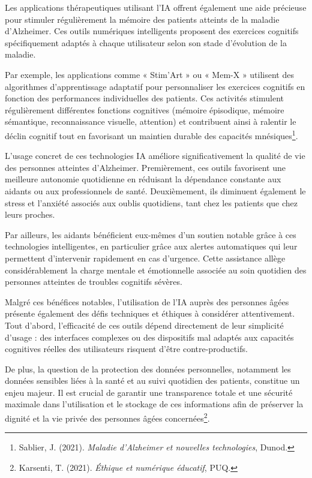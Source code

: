\documentclass[12pt,a4paper]{report}
\begin{document}
Les applications thérapeutiques utilisant l’IA offrent également une aide précieuse pour stimuler régulièrement la mémoire des patients atteints de la maladie d’Alzheimer. Ces outils numériques intelligents proposent des exercices cognitifs spécifiquement adaptés à chaque utilisateur selon son stade d’évolution de la maladie.

Par exemple, les applications comme « Stim’Art » ou « Mem-X » utilisent des algorithmes d’apprentissage adaptatif pour personnaliser les exercices cognitifs en fonction des performances individuelles des patients. Ces activités stimulent régulièrement différentes fonctions cognitives (mémoire épisodique, mémoire sémantique, reconnaissance visuelle, attention) et contribuent ainsi à ralentir le déclin cognitif tout en favorisant un maintien durable des capacités mnésiques\footnote{Sablier, J. (2021). \textit{Maladie d’Alzheimer et nouvelles technologies}, Dunod.}.

L’usage concret de ces technologies IA améliore significativement la qualité de vie des personnes atteintes d’Alzheimer. Premièrement, ces outils favorisent une meilleure autonomie quotidienne en réduisant la dépendance constante aux aidants ou aux professionnels de santé. Deuxièmement, ils diminuent également le stress et l’anxiété associés aux oublis quotidiens, tant chez les patients que chez leurs proches.

Par ailleurs, les aidants bénéficient eux-mêmes d’un soutien notable grâce à ces technologies intelligentes, en particulier grâce aux alertes automatiques qui leur permettent d’intervenir rapidement en cas d’urgence. Cette assistance allège considérablement la charge mentale et émotionnelle associée au soin quotidien des personnes atteintes de troubles cognitifs sévères.

Malgré ces bénéfices notables, l’utilisation de l’IA auprès des personnes âgées présente également des défis techniques et éthiques à considérer attentivement. Tout d’abord, l’efficacité de ces outils dépend directement de leur simplicité d’usage : des interfaces complexes ou des dispositifs mal adaptés aux capacités cognitives réelles des utilisateurs risquent d’être contre-productifs.

De plus, la question de la protection des données personnelles, notamment les données sensibles liées à la santé et au suivi quotidien des patients, constitue un enjeu majeur. Il est crucial de garantir une transparence totale et une sécurité maximale dans l’utilisation et le stockage de ces informations afin de préserver la dignité et la vie privée des personnes âgées concernées\footnote{Karsenti, T. (2021). \textit{Éthique et numérique éducatif}, PUQ.}.
\end{document}

